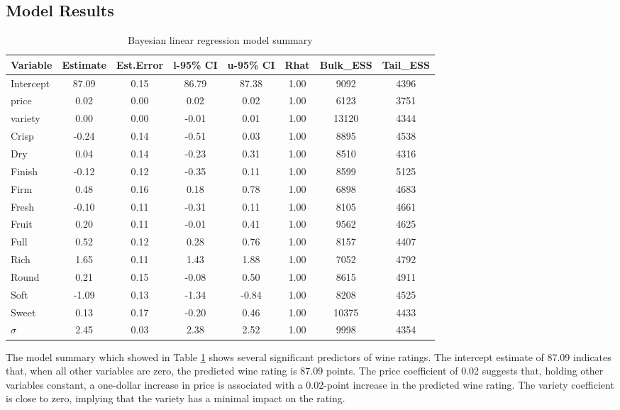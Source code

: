 \documentclass{article}
\begin{document}
\subsection{Model Results}
\begin{table}[htbp]
	\centering
	\caption{Bayesian linear regression model summary}
	\label{tab:model_summary}
\begin{tabular}{lccccccc}
	\toprule
	\textbf{Variable} & \textbf{Estimate} & \textbf{Est.Error} & \textbf{l-95\% CI} & \textbf{u-95\% CI} & \textbf{Rhat} & \textbf{Bulk\_ESS} & \textbf{Tail\_ESS} \\
	\midrule
	Intercept & 87.09 & 0.15 & 86.79 & 87.38 & 1.00 & 9092 & 4396 \\
	price     & 0.02  & 0.00 & 0.02  & 0.02  & 1.00 & 6123 & 3751 \\
	variety   & 0.00  & 0.00 & -0.01 & 0.01  & 1.00 & 13120 & 4344 \\
	Crisp     & -0.24 & 0.14 & -0.51 & 0.03  & 1.00 & 8895 & 4538 \\
	Dry       & 0.04  & 0.14 & -0.23 & 0.31  & 1.00 & 8510 & 4316 \\
	Finish    & -0.12 & 0.12 & -0.35 & 0.11  & 1.00 & 8599 & 5125 \\
	Firm      & 0.48  & 0.16 & 0.18  & 0.78  & 1.00 & 6898 & 4683 \\
	Fresh     & -0.10 & 0.11 & -0.31 & 0.11  & 1.00 & 8105 & 4661 \\
	Fruit     & 0.20  & 0.11 & -0.01 & 0.41  & 1.00 & 9562 & 4625 \\
	Full      & 0.52  & 0.12 & 0.28  & 0.76  & 1.00 & 8157 & 4407 \\
	Rich      & 1.65  & 0.11 & 1.43  & 1.88  & 1.00 & 7052 & 4792 \\
	Round     & 0.21  & 0.15 & -0.08 & 0.50  & 1.00 & 8615 & 4911 \\
	Soft      & -1.09 & 0.13 & -1.34 & -0.84 & 1.00 & 8208 & 4525 \\
	Sweet     & 0.13  & 0.17 & -0.20 & 0.46  & 1.00 & 10375 & 4433 \\
	\midrule
	$\sigma$ & 2.45 & 0.03 & 2.38 & 2.52 & 1.00 & 9998 & 4354 \\
	\bottomrule
\end{tabular}
\end{table}

The model summary which showed in Table \ref{tab:model_summary} shows several significant predictors of wine ratings. The intercept estimate of 87.09 indicates that, when all other variables are zero, the predicted wine rating is 87.09 points. The price coefficient of 0.02 suggests that, holding other variables constant, a one-dollar increase in price is associated with a 0.02-point increase in the predicted wine rating. The variety coefficient is close to zero, implying that the variety has a minimal impact on the rating.
\end{document}
